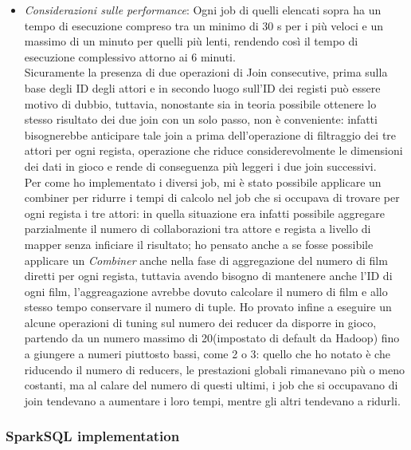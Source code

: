 \documentclass[hidelinks]{article}
\begin{document}
\begin{itemize}
\begin{itemize}
		
	\end{itemize}
	\item \textit{Considerazioni sulle performance}: Ogni job di quelli elencati sopra ha un tempo di esecuzione compreso tra un minimo di 30 s per i più veloci e un massimo di un minuto per quelli più lenti, rendendo così il tempo di esecuzione complessivo attorno ai 6 minuti.\\
	Sicuramente la presenza di due operazioni di Join consecutive, prima sulla base degli ID degli attori e in secondo luogo sull'ID dei registi può essere motivo di dubbio, tuttavia, nonostante sia in teoria possibile ottenere lo stesso risultato dei due join con un solo passo, non è conveniente: infatti bisognerebbe anticipare tale join a prima dell'operazione di filtraggio dei tre attori per ogni regista, operazione che riduce considerevolmente le dimensioni dei dati in gioco e rende di conseguenza più leggeri i due join successivi.\\
	Per come ho implementato i diversi job, mi è stato possibile applicare un combiner per ridurre i tempi di calcolo nel job che si occupava di trovare per ogni regista i tre attori: in quella situazione era infatti possibile aggregare parzialmente il numero di collaborazioni tra attore e regista a livello di mapper senza inficiare il risultato; ho pensato anche a se fosse possibile applicare un \textit{Combiner} anche nella fase di aggregazione del numero di film diretti per ogni regista, tuttavia avendo bisogno di mantenere anche l'ID di ogni film, l'aggreagazione avrebbe dovuto  calcolare il numero di film e allo stesso tempo conservare il numero di tuple.
	Ho provato infine a eseguire un alcune operazioni di tuning sul numero dei reducer da disporre in gioco, partendo da un numero massimo di 20(impostato di default da Hadoop) fino a giungere a numeri piuttosto bassi, come 2 o 3: quello che ho notato è che riducendo il numero di reducers, le prestazioni globali rimanevano più o meno costanti, ma al calare del numero di questi ultimi, i job che si occupavano di join tendevano a aumentare i loro tempi, mentre gli altri tendevano a ridurli. 
\end{itemize}

\subsubsection{SparkSQL implementation}
\end{document}

